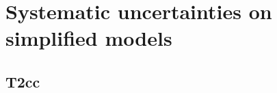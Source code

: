 \clearpage
\section{Systematic uncertainties on simplified models\label{app:signal}}

\subsection{T2cc\label{app:t2cc}}


